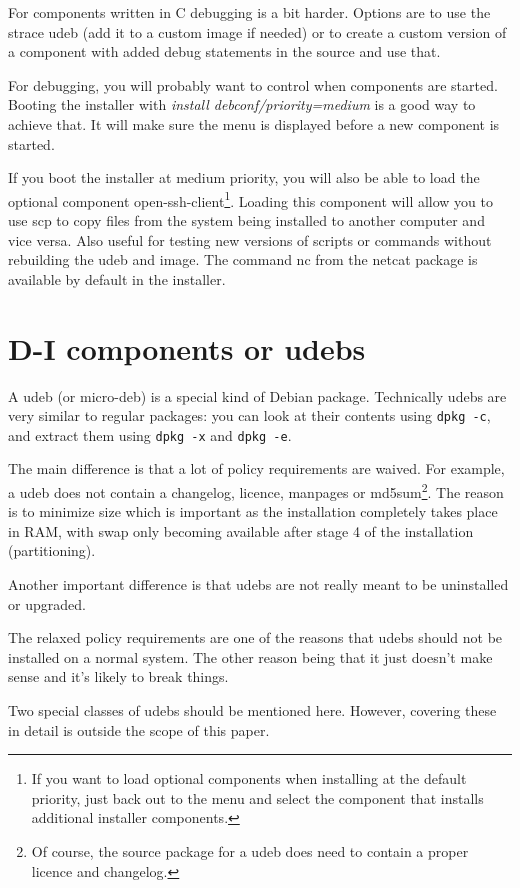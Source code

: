 \documentclass[a4paper,10pt]{article}
\begin{document}
For components written in C debugging is a bit harder. Options are to use the strace udeb (add it to a custom image if needed) or to create a custom version of a component with added debug statements in the source and use that. 

For debugging, you will probably want to control when components are started. Booting the installer with \textit{install debconf/priority=medium} is a good way to achieve that. It will make sure the menu is displayed before a new component is started. 

If you boot the installer at medium priority, you will also be able to load the optional component open-ssh-client\footnote{If you want to load optional components when installing at the default priority, just back out to the menu and select the component that installs additional installer components.}. Loading this component will allow you to use scp to copy files from the system being installed to another computer and vice versa. Also useful for testing new versions of scripts or commands without rebuilding the udeb and image. The command nc from the netcat package is available by default in the installer. 

\section{D-I components or udebs}
A udeb (or micro-deb) is a special kind of Debian package. Technically udebs are very similar to regular packages: you can look at their contents using \texttt{dpkg -c}, and extract them using \texttt{dpkg -x} and \texttt{dpkg -e}. 

The main difference is that a lot of policy requirements are waived. For example, a udeb does not contain a changelog, licence, manpages or md5sum\footnote{Of course, the source package for a udeb does need to contain a proper licence and changelog.}. The reason is to minimize size which is important as the installation completely takes place in RAM, with swap only becoming available after stage 4 of the installation (partitioning). 

Another important difference is that udebs are not really meant to be uninstalled or upgraded. 

The relaxed policy requirements are one of the reasons that udebs should not be installed on a normal system. The other reason being that it just doesn't make sense and it's likely to break things. 

Two special classes of udebs should be mentioned here. However, covering these in detail is outside the scope of this paper. 
\end{document}
